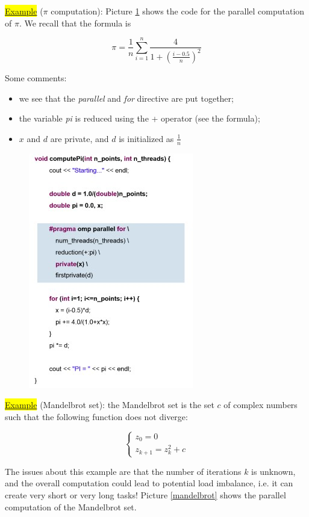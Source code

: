 \colorbox{yellow}{\underline{Example}} ($\pi$ computation): Picture \ref{pi_computation} shows the code for the parallel computation of $\pi$. We recall that the formula is 

$$
\pi = \frac{1}{n} \sum \limits_{i = 1}^n \frac{4}{1 + (\frac{i - 0.5}{n})^2}
$$

Some comments:

\begin{itemize}
    \item we see that the \textit{parallel} and \textit{for} directive are put together;
    \item the variable \textit{pi} is reduced using the + operator (see the formula);
    \item $x$ and $d$ are private, and $d$ is initialized as $\frac{1}{n}$
\end{itemize}

\begin{figure}[h!]
		\centering
		\includegraphics[scale = 1.8]{img/pi computation.jpg}
        \label{pi_computation}
\end{figure}


\colorbox{yellow}{\underline{Example}} (Mandelbrot set): the Mandelbrot set is the set $c$ of complex numbers such that the following function does not diverge:

$$
\begin{cases}
	z_0 = 0 \\
	z_{k + 1} = z_k^2 + c
\end{cases}
$$

The issues about this example are that the number of iterations $k$ is unknown, and the overall computation could lead to potential load imbalance, i.e. it can create very short or very long tasks! Picture \ref{mandelbrot} shows the parallel computation of the Mandelbrot set.

